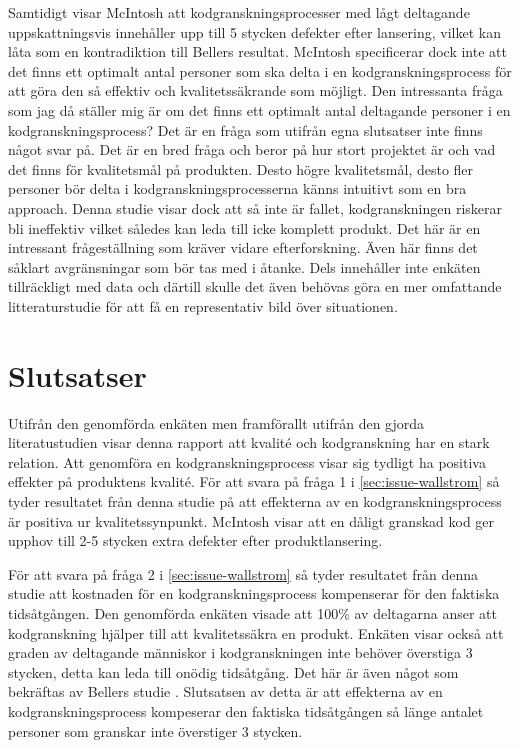 Samtidigt visar McIntosh \cite{mcintosh2014impact} att kodgranskningsprocesser med lågt deltagande uppskattningsvis innehåller upp till 5 stycken defekter efter lansering, vilket kan låta som en kontradiktion till Bellers \cite{beller2014modern} resultat. McIntosh specificerar dock inte att det finns ett optimalt antal personer som ska delta i en kodgranskningsprocess för att göra den så effektiv och kvalitetssäkrande som möjligt. Den intressanta fråga som jag då ställer mig är om det finns ett optimalt antal deltagande personer i en kodgranskningsprocess? Det är en fråga som utifrån egna slutsatser inte finns något svar på. Det är en bred fråga och beror på hur stort projektet är och vad det finns för kvalitetsmål på produkten. Desto högre kvalitetsmål, desto fler personer bör delta i kodgranskningsprocesserna känns intuitivt som en bra approach. Denna studie visar dock att så inte är fallet, kodgranskningen riskerar bli ineffektiv vilket således kan leda till icke komplett produkt. Det här är en intressant frågeställning som kräver vidare efterforskning. Även här finns det såklart avgränsningar som bör tas med i åtanke. Dels innehåller inte enkäten tillräckligt med data och därtill skulle det även behövas göra en mer omfattande litteraturstudie för att få en representativ bild över situationen.

 

\section{Slutsatser}
\label{sec:conclusions-wallstrom}
Utifrån den genomförda enkäten men framförallt utifrån den gjorda literatustudien visar denna rapport att kvalité och kodgranskning har en stark relation. Att genomföra en kodgranskningsprocess visar sig tydligt ha positiva effekter på produktens kvalité. För att svara på fråga 1 i \eqref{sec:issue-wallstrom} så tyder resultatet från denna studie på att effekterna av en kodgranskningsprocess är positiva ur kvalitetssynpunkt. McIntosh \cite{mcintosh2014impact} visar att en dåligt granskad kod ger upphov till 2-5 stycken extra defekter efter produktlansering.

För att svara på fråga 2 i \eqref{sec:issue-wallstrom} så tyder resultatet från denna studie att kostnaden för en kodgranskningsprocess kompenserar för den faktiska tidsåtgången. Den genomförda enkäten visade att 100\% av deltagarna anser att kodgranskning hjälper till att kvalitetssäkra en produkt. Enkäten visar också att graden av deltagande människor i kodgranskningen inte behöver överstiga 3 stycken, detta kan leda till onödig tidsåtgång. Det här är även något som bekräftas av Bellers studie \cite{beller2014modern}. Slutsatsen av detta är att effekterna av en kodgranskningsprocess kompeserar den faktiska tidsåtgången så länge antalet personer som granskar inte överstiger 3 stycken.


